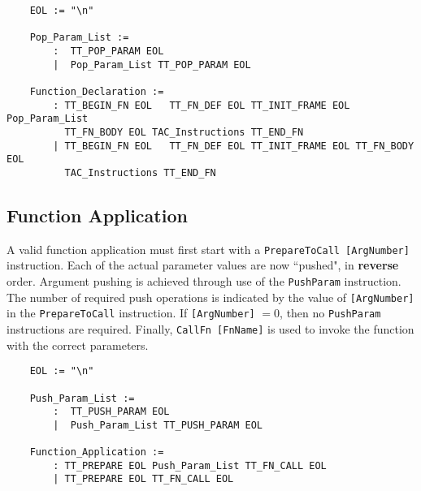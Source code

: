\begin{verbatim}
	EOL := "\n"
	
	Pop_Param_List :=
	    :  TT_POP_PARAM EOL
	    |  Pop_Param_List TT_POP_PARAM EOL
	
	Function_Declaration :=
	    : TT_BEGIN_FN EOL	TT_FN_DEF EOL TT_INIT_FRAME EOL Pop_Param_List
	      TT_FN_BODY EOL TAC_Instructions TT_END_FN
	    | TT_BEGIN_FN EOL	TT_FN_DEF EOL TT_INIT_FRAME EOL TT_FN_BODY EOL 
	      TAC_Instructions TT_END_FN
\end{verbatim}

\subsection{Function Application}
A valid function application must first start with a \verb!PrepareToCall [ArgNumber]! instruction. Each of the actual parameter values are now ``pushed", in \textbf{reverse} order. Argument pushing is achieved through use of the \verb!PushParam! instruction. The number of required push operations is indicated by the value of \verb![ArgNumber]! in the \verb!PrepareToCall! instruction. If \verb![ArgNumber]! $ = 0$, then no \verb!PushParam! instructions are required. Finally, \verb!CallFn [FnName]! is used to invoke the function with the correct parameters.

\begin{verbatim}
	EOL := "\n"
	
	Push_Param_List :=
	    :  TT_PUSH_PARAM EOL
	    |  Push_Param_List TT_PUSH_PARAM EOL
	
	Function_Application :=
	    : TT_PREPARE EOL Push_Param_List TT_FN_CALL EOL
	    | TT_PREPARE EOL TT_FN_CALL EOL
\end{verbatim}


